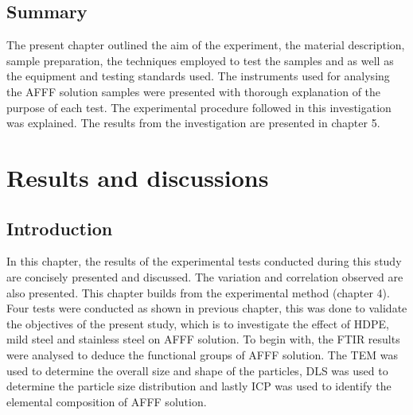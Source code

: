 \documentclass[12pt]{report}
\begin{document}

\section{Summary}
The present chapter outlined the aim of the experiment, the material description, sample preparation, the techniques employed to test the samples and as well as the equipment and testing standards used. The instruments used for analysing the AFFF solution samples were presented with thorough explanation of the purpose of each test. The experimental procedure followed in this investigation was explained. The results from the investigation are presented in chapter 5.

\chapter{Results and discussions}
\section{Introduction}
In this chapter, the results of the experimental tests conducted during this study are concisely presented and discussed. The variation and correlation observed are also presented. This chapter builds from the experimental method (chapter 4).  Four tests were conducted as shown in previous chapter, this was done to validate the objectives of the present study, which is to investigate the effect of HDPE, mild steel and stainless steel on AFFF solution. 
To begin with, the FTIR results were analysed to deduce the functional groups of AFFF solution. The TEM was used to determine the overall size and shape of the particles, DLS was used to determine the particle size distribution and lastly ICP was used to identify the elemental composition of AFFF solution.  
\end{document}

